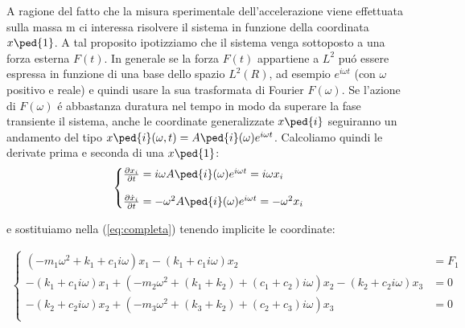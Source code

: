 \documentclass[12pt,a4paper]{article}
\makeatletter
\newenvironment{sistema}%
  {\left\lbrace\begin{array}{@{}l@{}}}%
  {\end{array}\right.}
\makeatother
\begin{document}
	
		A ragione del fatto che la misura sperimentale dell'accelerazione viene effettuata sulla massa m ci interessa risolvere il sistema in funzione della coordinata $x\ped{1}$. A tal proposito ipotizziamo che il sistema venga sottoposto a una forza esterna $F(t)$. In generale se la forza $F(t)$ appartiene a  $L^2$ pu\'o essere espressa in funzione di una base dello spazio $L^2(R)$, ad esempio $e^{i\omega t}$ (con $\omega$ positivo e reale) e quindi usare la sua trasformata di Fourier $F(\omega)$. Se l'azione di $F(\omega)$ \'e abbastanza duratura nel tempo in modo da superare la fase transiente il sistema, anche le coordinate generalizzate $x\ped{i} $ seguiranno un andamento del tipo $x\ped{i}(\omega, t)=A\ped{i}(\omega)e^{i\omega t}$. Calcoliamo quindi le derivate prima e seconda di una $x\ped{1}$:
		\begin {gather}
		\begin{sistema}
		\frac{\partial x_i}{\partial t }= i \omega A\ped{i}(\omega)e^{i\omega t}=i \omega x_i
		\\
		\\
		\frac{\partial \dot x_i}{\partial t }= - \omega ^2 A\ped{i}(\omega)e^{i\omega t}=-\omega^2 x_i
		\end{sistema}
		\end{gather}
		
		e sostituiamo nella (\ref{eq:completa}) tenendo implicite le coordinate:
		
		\begin {gather}
		\begin{cases}
		(-m_1 \omega^2  + k_1 + c_1 i\omega)x_1 - (k_1 + c_1 i\omega)x_2& =  F_1 \\
		-(k_1  + c_1  i\omega)x_1 +(-m_2 \omega^2 + (k_1 +k_2 ) + (c_1 + c_2) i\omega)x_2 - (k_2  + c_2 i\omega)x_3& = 0\\
		-(k_2  + c_2 i\omega)x_2+ (-m_3 \omega^2 + (k_3 +k_2) +(c_2 + c_3) i\omega)x_3& = 0\\
		\end{cases}
		\end {gather}
		
\end{document}
